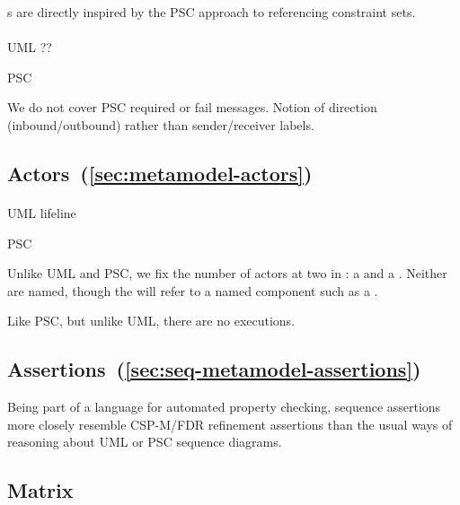 \mrefmessageset s are directly inspired by the PSC approach to referencing constraint sets.

\paragraph{\mmessagespec}
\begin{featset}
\item[UML] ??
\item[PSC] 
\end{featset}

We do not cover PSC required or fail messages.
Notion of direction (inbound/outbound) rather than sender/receiver labels.

\subsection{Actors~(\ref{sec:metamodel-actors})}

\paragraph{\mactor}
\begin{featset}
\item[UML] lifeline
\item[PSC] 
\end{featset}

Unlike UML and PSC, we fix the number of actors at two
 in \langname: a \mtarget{} and a \mworld{}.
Neither are named, though the \mtarget{} will refer to a
named component such as a \mrcmodule.

Like PSC, but unlike UML, there are no executions.

\subsection{Assertions~(\ref{sec:seq-metamodel-assertions})}

Being part of a language for automated property checking,
\langname{} sequence assertions more closely resemble CSP-M/FDR refinement
assertions than the usual ways of reasoning about UML or PSC sequence diagrams.

\subsection{Matrix}

\newcommand\rot{\rotatebox{90}}
\newcommand\matding[1]{{\small#1}}
\newcommand\OK{\matding{\checkmark}}
\newcommand\ISH{\matding{E}}
\newcommand\NO{\matding{\(\bullet\)}}
\newcommand\SOON{\matding{\(\circ\)}}
\newcommand\NA{\matding{n/a}}
\newcommand\INTIMED{\matding{T}}
\newcommand\INPROB{\matding{P}}

